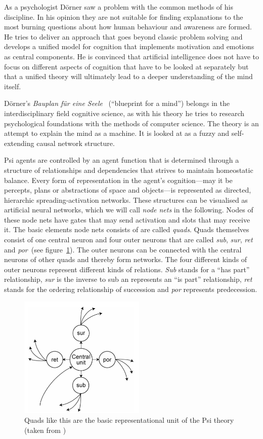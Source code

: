 As a psychologist Dörner saw a problem with the common methods of his discipline. In his opinion they are not suitable for finding explanations to the most burning questions about how human behaviour and awareness are formed. He tries to deliver an approach that goes beyond classic problem solving and develops a unified model for cognition that implements motivation and emotions as central components. He is convinced that artificial intelligence does not have to focus on different aspects of cognition that have to be looked at separately but that a unified theory will ultimately lead to a deeper understanding of the mind itself.
    
Dörner's \emph{Bauplan für eine Seele}~\cite{Doerner1998} (``blueprint for a mind'') belongs in the interdisciplinary field cognitive science, as with his theory he tries to research psychological foundations with the methods of computer science. The theory is an attempt to explain the mind as a machine. It is looked at as a fuzzy and self-extending causal network structure. 

Psi agents are controlled by an agent function that is determined through a structure of relationships and dependencies that strives to maintain homeostatic balance. Every form of representation in the agent's cognition---may it be percepts, plans or abstractions of space and objects---is represented as directed, hierarchic spreading-activation networks. These structures can be visualised as artificial neural networks, which we will call \emph{node nets} in the following. Nodes of these node nets have gates that may send activation and slots that may receive it. The basic elements node nets consists of are called \emph{quads}. Quads themselves consist of one central neuron and four outer neurons that are called \emph{sub}, \emph{sur}, \emph{ret} and \emph{por}~(see figure~\ref{quad}). The outer neurons can be connected with the central neurons of other quads and thereby form networks. The four different kinds of outer neurons represent different kinds of relations. \emph{Sub} stands for a ``has part'' relationship, \emph{sur} is the inverse to sub an represents an ``is part'' relationship, \emph{ret} stands for the ordering relationship of succession and \emph{por} represents predecession.

\begin{figure}[h]
  \centering
    \includegraphics[width=6cm]{graphics/quad}
  \caption[A quad]{Quads like this are the basic representational unit of the Psi theory (taken from \cite{Bach:2009:PSI:1611304})}
  \label{quad}
\end{figure}

